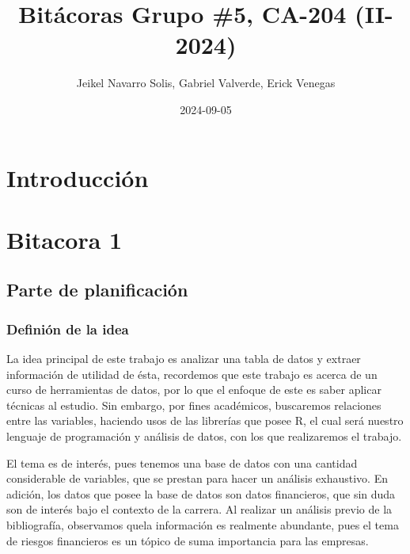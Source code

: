 \documentclass[
  letterpaper,
  DIV=11,
  numbers=noendperiod]{scrreprt}
\title{Bitácoras Grupo \#5, CA-204 (II-2024)}
\author{Jeikel Navarro Solis, Gabriel Valverde, Erick Venegas}
\date{2024-09-05}
\renewcommand*\contentsname{Tabla de contenidos}
\newcommand\contentsname{Tabla de contenidos}
\begin{document}
\maketitle

\renewcommand*\contentsname{Tabla de contenidos}
{
\hypersetup{linkcolor=}
\setcounter{tocdepth}{2}
\tableofcontents
}


\chapter*{Introducción}\label{introducciuxf3n}



\chapter{Bitacora 1}\label{bitacora-1}

\section{Parte de planificación}\label{parte-de-planificaciuxf3n}

\subsection{Definión de la idea}\label{definiuxf3n-de-la-idea}

La idea principal de este trabajo es analizar una tabla de datos y
extraer información de utilidad de ésta, recordemos que este trabajo es
acerca de un curso de herramientas de datos, por lo que el enfoque de
este es saber aplicar técnicas al estudio. Sin embargo, por fines
académicos, buscaremos relaciones entre las variables, haciendo usos de
las librerías que posee R, el cual será nuestro lenguaje de programación
y análisis de datos, con los que realizaremos el trabajo.

El tema es de interés, pues tenemos una base de datos con una cantidad
considerable de variables, que se prestan para hacer un análisis
exhaustivo. En adición, los datos que posee la base de datos son datos
financieros, que sin duda son de interés bajo el contexto de la carrera.
Al realizar un análisis previo de la bibliografía, observamos quela
información es realmente abundante, pues el tema de riesgos financieros
es un tópico de suma importancia para las empresas.
\end{document}
